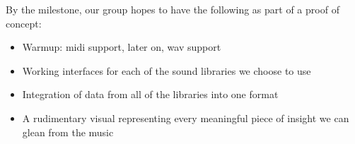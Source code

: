 \documentclass{article}
\begin{document}
By the milestone, our group hopes to have the following as part of a proof of concept:

\begin{itemize}
	\item Warmup: midi support, later on, wav support
	\item Working interfaces for each of the sound libraries we choose to use
	\item Integration of data from all of the libraries into one format
	\item A rudimentary visual representing every meaningful piece of insight we can glean from the music
\end{itemize}
\end{document}
